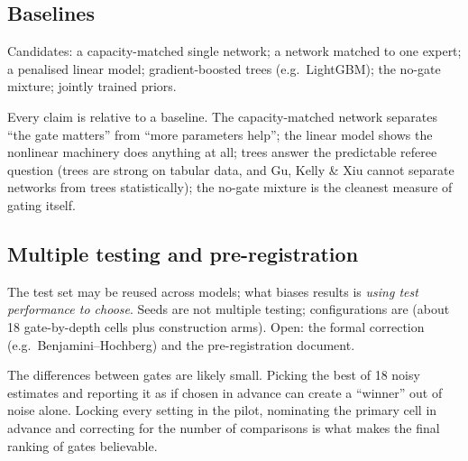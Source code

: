 \subsection{Baselines}

 Candidates: a capacity-matched single network; a network matched to one expert; a penalised
linear model; gradient-boosted trees (e.g.\ LightGBM); the no-gate mixture; jointly trained priors.

\begin{whybox}
Every claim is relative to a baseline. The capacity-matched network separates ``the gate matters'' from
``more parameters help''; the linear model shows the nonlinear machinery does anything at all; trees answer
the predictable referee question (trees are strong on tabular data, and Gu, Kelly \& Xiu cannot separate
networks from trees statistically); the no-gate mixture is the cleanest measure of gating itself.
\end{whybox}

\subsection{Multiple testing and pre-registration}

 The test set may be reused across models; what biases results is \emph{using test performance to
choose}. Seeds are not multiple testing; configurations are (about 18 gate-by-depth cells plus construction
arms). Open: the formal correction (e.g.\ Benjamini--Hochberg) and the pre-registration document.

\begin{whybox}
The differences between gates are likely small. Picking the best of 18 noisy estimates and reporting it as
if chosen in advance can create a ``winner'' out of noise alone. Locking every setting in the pilot,
nominating the primary cell in advance and correcting for the number of comparisons is what makes the
final ranking of gates believable.
\end{whybox}
